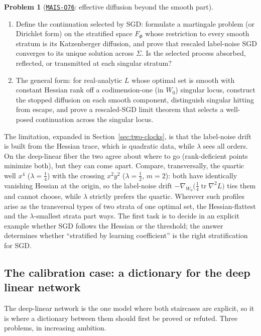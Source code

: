 \documentclass[11pt]{amsart}
\newcommand{\Oid}[1]{\href{https://github.com/lionellevine/MAIS/blob/main/open-problems/MAIS-O#1.md}{\texttt{MAIS-O#1}}}
\theoremstyle{plain}
\theoremstyle{definition}
\newtheorem{problem}[theorem]{Problem}
\newcommand{\tr}{\operatorname{tr}}
\begin{document}
\begin{problem}[\Oid{76}: effective diffusion beyond the smooth part]
\begin{enumerate}
\item[(b)] Define the continuation selected by SGD: formulate a martingale problem (or Dirichlet form) on the stratified space $F_\Phi$ whose restriction to every smooth stratum is its Katzenberger diffusion, and prove that rescaled label-noise SGD converges to its unique solution across $\Sigma$. Is the selected process absorbed, reflected, or transmitted at each singular stratum?
\item[(c)] The general form: for real-analytic $L$ whose optimal set is smooth with constant Hessian rank off a codimension-one (in $W_0$) singular locus, construct the stopped diffusion on each smooth component, distinguish singular hitting from escape, and prove a rescaled-SGD limit theorem that selects a well-posed continuation across the singular locus.
\end{enumerate}
\end{problem}

The limitation, expanded in Section~\ref{sec:two-clocks}, is that the label-noise drift is built from the Hessian trace, which is quadratic data, while $\lambda$ sees all orders. On the deep-linear fiber the two agree about where to go (rank-deficient points minimize both), but they can come apart. Compare, transversally, the quartic well $x^4$ ($\lambda = \tfrac14$) with the crossing $x^2 y^2$ ($\lambda = \tfrac12$, $m = 2$): both have identically vanishing Hessian at the origin, so the label-noise drift $-\nabla_{W_0}\bigl(\tfrac14 \tr \nabla^2 L\bigr)$ ties them and cannot choose, while $\lambda$ strictly prefers the quartic. Wherever such profiles arise as the transversal types of two strata of one optimal set, the Hessian-flattest and the $\lambda$-smallest strata part ways. The first task is to decide in an explicit example whether SGD follows the Hessian or the threshold; the answer determines whether ``stratified by learning coefficient'' is the right stratification for SGD.

\subsection{The calibration case: a dictionary for the deep linear network}\label{sec:dictionary}

The deep-linear network is the one model where both staircases are explicit, so it is where a dictionary between them should first be proved or refuted. Three problems, in increasing ambition.
\end{document}
